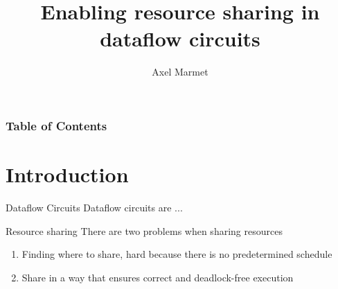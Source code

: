 \documentclass{beamer}
\title[Resource Sharing] %
{Enabling resource sharing in dataflow circuits}
\author[Marmet] %
{Axel Marmet}
\institute[EPFL] %
\date[2020] %
\begin{document}
\frame{\titlepage}


\begin{frame}
\frametitle{Table of Contents}
\tableofcontents
\end{frame}

\section{Introduction}
\begin{frame}{Dataflow Circuits}
    Dataflow circuits are ...
\end{frame}
\begin{frame}{Resource sharing}
    There are two problems when sharing resources
    \begin{enumerate}
        \item Finding where to share, hard because there is no predetermined schedule
        \item Share in a way that ensures correct and deadlock-free execution
    \end{enumerate}
\end{frame}
\end{document}
